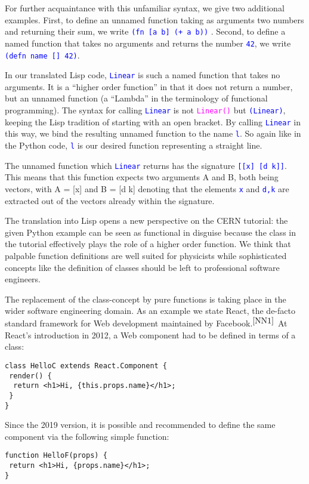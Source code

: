 \documentclass[twocolumn]{article}
\begin{document}
For further acquaintance with this unfamiliar syntax, we give two additional examples. First, to define an unnamed function taking as arguments two numbers and returning their sum, we write \texttt{\textcolor{blue}{(fn [a b] (+ a b))}} . Second, to define a named function that takes no arguments and returns the number \texttt{\textcolor{blue}{42}}, we write \texttt{\textcolor{blue}{(defn name [] 42)}}.

In our translated Lisp code, \texttt{\textcolor{blue}{Linear}} is such a named function that takes no arguments. It is a “higher order function” in that it does not return a number, but an unnamed function (a “Lambda” in the terminology of functional programming). The syntax for calling \texttt{\textcolor{blue}{Linear}} is not \texttt{\textcolor{magenta}{Linear()}} but \texttt{\textcolor{blue}{(Linear)}}, keeping the Lisp tradition of starting with an open bracket. By calling \texttt{\textcolor{blue}{Linear}} in this way, we bind the resulting unnamed function to the name \texttt{\textcolor{blue}{l}}. So again like in the Python code, \texttt{\textcolor{blue}{l}} is our desired function representing a straight line. 

The unnamed function which \texttt{\textcolor{blue}{Linear}} returns has the signature \texttt{\textcolor{blue}{[[x] [d k]]}}. This means that this function expects two arguments A and B, both being vectors, with A = [x] and B = [d k] denoting that the elements \texttt{\textcolor{blue}{x}} and \texttt{\textcolor{blue}{d,k}} are extracted out of the vectors already within the signature.

The translation into Lisp opens a new perspective on the CERN tutorial: the given Python example can be seen as functional in disguise because the class in the tutorial effectively plays the role of a higher order function. We think that palpable function definitions are well suited for physicists while sophisticated concepts like the definition of classes should be left to professional software engineers.

The replacement of the class-concept by pure functions is taking place in the wider software engineering domain. As an example we state React, the de-facto standard framework for Web development maintained by Facebook.$^{\cite{NN1}}$
At React’s introduction in 2012, a Web component had to be defined in terms of a class:
{\color{magenta}\begin{verbatim}
class HelloC extends React.Component {
 render() {
  return <h1>Hi, {this.props.name}</h1>;
 }
}
\end{verbatim}}
Since the 2019 version, it is possible and recommended to define the same component via the following simple function:
{\color{magenta}\begin{verbatim}
function HelloF(props) {
 return <h1>Hi, {props.name}</h1>;
}
\end{verbatim}}
\end{document}
